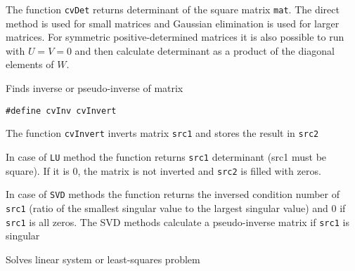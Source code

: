 \begin{description}
\end{description}

The function \texttt{cvDet} returns determinant of the square matrix \texttt{mat}. The direct method is used for small matrices and Gaussian elimination is used for larger matrices. For symmetric positive-determined matrices it is also possible to run
with $U = V = 0$ and then calculate determinant as a product of the diagonal elements of $W$.


Finds inverse or pseudo-inverse of matrix

\begin{lstlisting}
#define cvInv cvInvert
\end{lstlisting}

\begin{description}
\end{description}

The function \texttt{cvInvert} inverts matrix \texttt{src1} and stores the result in \texttt{src2}

In case of \texttt{LU} method the function returns \texttt{src1} determinant (src1 must be square). If it is 0, the matrix is not inverted and \texttt{src2} is filled with zeros.

In case of \texttt{SVD} methods the function returns the inversed condition number of \texttt{src1} (ratio of the smallest singular value to the largest singular value) and 0 if \texttt{src1} is all zeros. The SVD methods calculate a pseudo-inverse matrix if \texttt{src1} is singular



Solves linear system or least-squares problem


